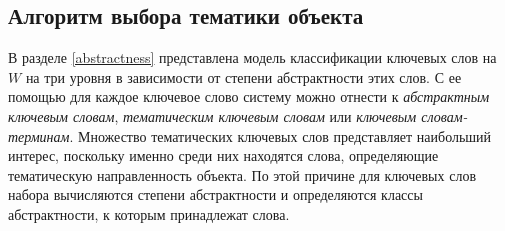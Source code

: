 

\subsection{Алгоритм выбора тематики объекта} 
В разделе \ref{abstractness} представлена модель классификации ключевых слов на $W$ на три уровня в зависимости от степени абстрактности этих слов. С ее помощью для каждое ключевое слово систему можно отнести к \emph{абстрактным ключевым словам}, \emph{тематическим ключевым словам} или \emph{ключевым словам-терминам}. Множество тематических ключевых слов представляет наибольший интерес, поскольку именно среди них находятся слова, определяющие тематическую направленность объекта. По этой причине  для ключевых слов набора вычисляются степени абстрактности и определяются классы абстрактности, к которым принадлежат слова.

